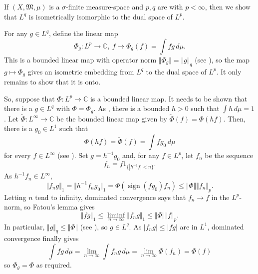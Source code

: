 \documentclass[12pt]{article}
\begin{document}
If $(X,\mathfrak{M},\mu)$ is a $\sigma$-finite measure-space and $p,q$ are  with $p<\infty$, then we show that $L^q$ is isometrically isomorphic to the dual space of $L^p$.

For any $g\in L^q$, define the linear map
\begin{equation*}
\Phi_g\colon L^p\rightarrow\mathbb{C},\ f\mapsto \Phi_g(f)=\int fg\,d\mu.
\end{equation*}
This is a bounded linear map with operator norm $\Vert\Phi_g\Vert=\Vert g\Vert_q$ (see ), so the map $g\mapsto\Phi_g$ gives an isometric embedding from $L^q$ to the dual space of $L^p$. It only remains to show that it is onto.

So, suppose that $\Phi\colon L^p\rightarrow\mathbb{C}$ is a bounded linear map. It needs to be shown that there is a $g\in L^q$ with $\Phi=\Phi_g$.
As , there is a bounded $h>0$ such that $\int h\,d\mu=1$.
Let $\tilde\Phi\colon L^\infty\rightarrow\mathbb{C}$ be the bounded linear map given by $\tilde\Phi(f)=\Phi(hf)$. Then, there is a $g_0\in L^1$ such that
\begin{equation*}
\Phi(hf)=\tilde\Phi(f)=\int fg_0\,d\mu
\end{equation*}
for every $f\in L^\infty$ (see ). Set $g=h^{-1}g_0$ and, for any $f\in L^p$, let $f_n$ be the sequence
\begin{equation*}
f_n = f 1_{\{|h^{-1}f|<n\}}.
\end{equation*}
As $h^{-1}f_n\in L^\infty$,
\begin{equation*}
\Vert f_ng\Vert_1 =\Vert h^{-1}f_ng_0\Vert_1=\Phi(\operatorname{sign}(fg_0)f_n)\le\Vert\Phi\Vert \Vert f_n\Vert_p.
\end{equation*}
Letting $n$ tend to infinity, dominated convergence says that $f_n\rightarrow f$ in the $L^p$-norm, so Fatou's lemma gives
\begin{equation*}
\Vert f g\Vert_1\le\liminf_{n\rightarrow\infty}\Vert f_n g\Vert_1\le\Vert\Phi\Vert\Vert f\Vert_p.
\end{equation*}
In particular, $\Vert g\Vert_q\le\Vert\Phi\Vert$ (see ), so $g\in L^q$. As $|f_ng|\le|fg|$ are in $L^1$, dominated convergence finally gives
\begin{equation*}
\int fg\,d\mu =\lim_{n\rightarrow\infty}\int f_ng\,d\mu=\lim_{n\rightarrow\infty}\Phi(f_n)=\Phi(f)
\end{equation*}
so $\Phi_g=\Phi$ as required.

\end{document}
